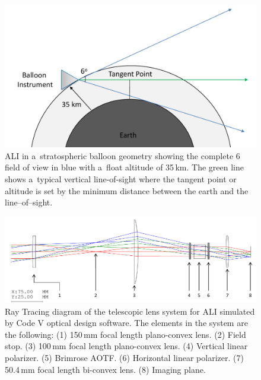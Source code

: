 \documentclass[amtd, online, hvmath]{copernicus}
\begin{document}
\begin{figure}
\includegraphics[width=120mm]{amt-2015-329-discussions-f03.pdf}
\caption{ALI in a~stratospheric balloon geometry showing the complete
  6{\degree} field of view in blue with a~float altitude of
  35\,\unit{km}. The green line shows a~typical vertical line-of-sight
  where the tangent point or altitude is set by the minimum distance
  between the earth and the line--of--sight.}
\label{amtd-2015-0329-f03.pdf}
\end{figure}

\begin{figure}
\includegraphics[width=120mm]{amt-2015-329-discussions-f04.pdf}
\caption{Ray Tracing diagram of the telescopic lens system for ALI
  simulated by Code V optical design software. The elements in the
  system are the following: (1) 150\,\unit{mm} focal length
  plano-convex lens. (2) Field stop.  (3) 100\,\unit{mm} focal length
  plano-convex lens. (4) Vertical linear polarizer.  (5) Brimrose
  AOTF. (6) Horizontal linear polarizer. (7) 50.4\,\unit{mm} focal
  length bi-convex lens. (8) Imaging plane.}
\label{amtd-2015-0329-f04.pdf}
\end{figure}
\end{document}
